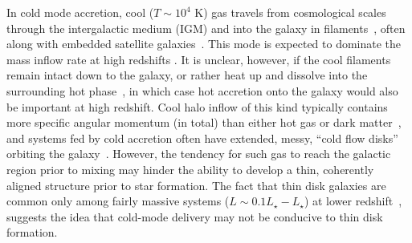 \documentclass[fleqn,usenatbib]{mnras}
\begin{document}
In cold mode accretion, cool ($T \sim 10^4$ K) gas travels from cosmological scales through the intergalactic medium (IGM) and into the galaxy in filaments~\cite[e.g.][]{Keres2005, Keres2009, Dekel2006, Faucher-Giguere2011a, Martin2019a}, often along with embedded satellite galaxies~\citep[e.g.][]{Faucher-Giguere2015, Faucher-Giguere2016, Hafen2019, Esmerian2021}.
This mode is expected to dominate the mass inflow rate at high redshifts \citep[$z\gtrsim2$; e.g.][]{Keres2009a, Dekel2009, Huscher2021}.
It is unclear, however, if the cool filaments remain intact down to the galaxy, or rather heat up and dissolve into the surrounding hot phase~\citep[e.g.][]{Nelson2016, Mandelker2016, Mandelker2018, Mandelker2020a}, in which case hot accretion onto the galaxy would also be important at high redshift.
Cool halo inflow of this kind typically contains more specific angular momentum (in total) than either hot gas or dark matter~\citep[e.g.][]{Stewart2017}, and systems fed by cold accretion often have extended, messy, ``cold flow disks'' orbiting the galaxy~\citep[e.g.][]{Stewart2011a, Stewart2013, Danovich2015, Dekel2019}.
However, the tendency for such gas to reach the galactic region prior to mixing may hinder the ability to develop a thin, coherently aligned structure prior to star formation.
The fact that thin disk galaxies are common only among fairly massive systems ($L \sim 0.1 L_\star - L_\star$) at lower redshift~\citep[e.g.][]{Kranz2003, Kassin2006, Bizyaev2021, Kassin2012a, Simons2015, Simons2017}, suggests the idea that cold-mode delivery may not be conducive to thin disk formation.
\end{document}
